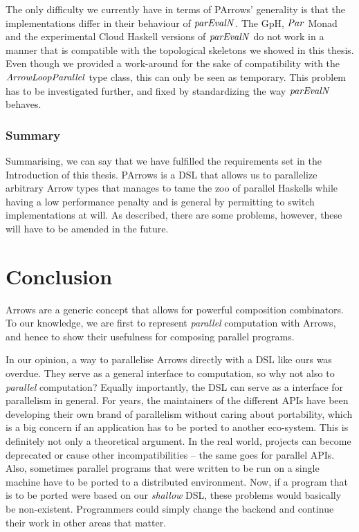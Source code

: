 \documentclass[paper=A4,twoside=true,openright,parskip=full,chapterprefix=true,headings=normal,bibliography=totoc,listof=totoc,titlepage=on,captions=tableabove,draft=false,british]{scrreprt}%
\begin{document}
The only difficulty we currently have in terms of PArrows' generality is
that the implementations differ in their behaviour of \ensuremath{\Varid{parEvalN}}. The
GpH, \ensuremath{\Conid{Par}} Monad and the experimental Cloud Haskell versions of
\ensuremath{\Varid{parEvalN}} do not work in a manner that is compatible with the
topological skeletons we showed in this thesis. Even though we provided
a work-around for the sake of compatibility with the \ensuremath{\Conid{ArrowLoopParallel}}
type class, this can only be seen as temporary. This problem has to be
investigated further, and fixed by standardizing the way \ensuremath{\Varid{parEvalN}}
behaves.

\hypertarget{summary}{%
\subsubsection{Summary}\label{summary}}

Summarising, we can say that we have fulfilled the requirements set in
the Introduction of this thesis. PArrows is a DSL that allows us to
parallelize arbitrary Arrow types that manages to tame the zoo of
parallel Haskells while having a low performance penalty and is general
by permitting to switch implementations at will. As described, there are
some problems, however, these will have to be amended in the future.

\hypertarget{conclusion}{%
\section{Conclusion}\label{conclusion}}

\label{sec:outlookConclusion}

Arrows are a generic concept that allows for powerful composition
combinators. To our knowledge, we are first to represent \emph{parallel}
computation with Arrows, and hence to show their usefulness for
composing parallel programs.

In our opinion, a way to parallelise Arrows directly with a DSL like
ours was overdue. They serve as a general interface to computation, so
why not also to \emph{parallel} computation? Equally importantly, the
DSL can serve as a interface for parallelism in general. For years, the
maintainers of the different APIs have been developing their own brand
of parallelism without caring about portability, which is a big concern
if an application has to be ported to another eco-system. This is
definitely not only a theoretical argument. In the real world, projects
can become deprecated or cause other incompatibilities -- the same goes
for parallel APIs. Also, sometimes parallel programs that were written
to be run on a single machine have to be ported to a distributed
environment. Now, if a program that is to be ported were based on our
\emph{shallow} DSL, these problems would basically be non-existent.
Programmers could simply change the backend and continue their work in
other areas that matter.
\end{document}
